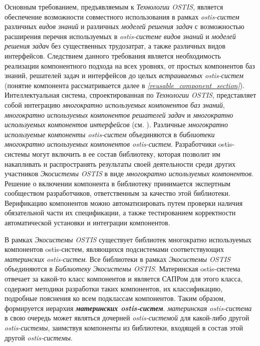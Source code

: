 Основным требованием, предъявляемым к \textit{Технологии OSTIS}, является обеспечение возможности совместного использования в рамках \textit{ostis-систем} различных \textit{видов знаний} и различных \textit{моделей решения задач} с возможностью  расширения перечня используемых в \textit{ostis-системе} \textit{видов знаний} и \textit{моделей решения задач} без существенных трудозатрат, а также различных видов интерфейсов. Следствием данного требования является необходимость реализации компонентного подхода на всех уровнях, от простых компонентов баз знаний, решателей задач и интерфейсов до целых \textit{встраиваемых ostis-систем} (понятие компонента рассматривается далее в \textit{\ref{reusable_component_section}}). Интеллектуальная система, спроектированная по \textit{Технологии OSTIS}, представляет собой интеграцию \textit{многократно используемых компонентов баз знаний}, \textit{многократно используемых компонентов решателей задач} и \textit{многократно используемых компонентов интерфейсов} (см. ). Различные \textit{многократно используемые компоненты ostis-систем} объединяются в \textit{библиотеки многократно используемых компонентов ostis-систем}. Разработчики  ostis-системы могут включить в ее состав библиотеку, которая позволит им накапливать и распространять результаты своей деятельности среди других участников \textit{Экосистемы OSTIS} в виде \textit{многократно используемых компонентов}. Решение о включении компонента в библиотеку принимается экспертным сообществом разработчиков, ответственным за качество этой библиотеки. Верификацию компонентов можно автоматизировать путем проверки наличия обязательной части их спецификации, а также тестированием корректности автоматической установки и интеграции компонентов.

В рамках \textit{Экосистемы OSTIS} существует  библиотек многократно используемых компонентов ostis-систем, являющихся подсистемами соответствующих \textit{материнских ostis-систем}. Все библиотеки в рамках \textit{Экосистемы OSTIS} объединяются в \textit{Библиотеку Экосистемы OSTIS}. Материнская ostis-система отвечает за какой-то класс компонентов и является САПРом для этого класса, содержит методики разработки таких компонентов, их классификацию, подробные пояснения ко всем подклассам компонентов. Таким образом, формируется иерархия \textbf{\textit{материнских ostis-систем}}. \textit{материнская ostis-система} в свою очередь может являться дочерней \textit{ostis-системой} для какой-либо другой \textit{ostis-системы}, заимствуя компоненты из библиотеки, входящей в состав этой другой \textit{ostis-системы}.


